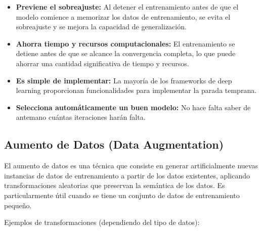 \documentclass{article}
\begin{document}
\begin{itemize}
    \item \textbf{Previene el sobreajuste:}  Al detener el entrenamiento antes de que el modelo comience a memorizar los datos de entrenamiento, se evita el sobreajuste y se mejora la capacidad de generalización.
    \item \textbf{Ahorra tiempo y recursos computacionales:}  El entrenamiento se detiene antes de que se alcance la convergencia completa, lo que puede ahorrar una cantidad significativa de tiempo y recursos.
    \item \textbf{Es simple de implementar:}  La mayoría de los frameworks de deep learning proporcionan funcionalidades para implementar la parada temprana.
    \item \textbf{Selecciona automáticamente un buen modelo:} No hace falta saber de antemano cuántas iteraciones harán falta.
\end{itemize}

\subsection{Aumento de Datos (Data Augmentation)}

El aumento de datos es una técnica que consiste en generar artificialmente nuevas instancias de datos de entrenamiento a partir de los datos existentes, aplicando transformaciones aleatorias que preservan la semántica de los datos.  Es particularmente útil cuando se tiene un conjunto de datos de entrenamiento pequeño.

Ejemplos de transformaciones (dependiendo del tipo de datos):
\end{document}
